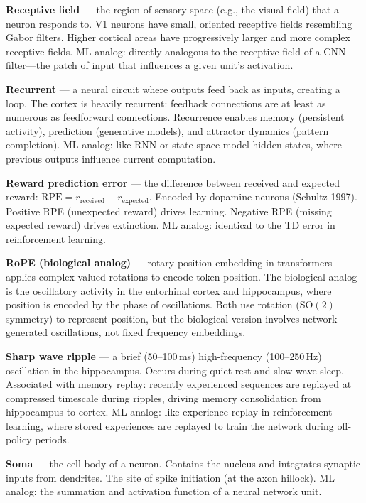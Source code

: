 \documentclass[11pt,a4paper]{article}
\begin{document}
\textbf{Receptive field} --- the region of sensory space (e.g., the visual field) that a neuron responds to. V1 neurons have small, oriented receptive fields resembling Gabor filters. Higher cortical areas have progressively larger and more complex receptive fields. ML analog: directly analogous to the receptive field of a CNN filter---the patch of input that influences a given unit's activation.

\textbf{Recurrent} --- a neural circuit where outputs feed back as inputs, creating a loop. The cortex is heavily recurrent: feedback connections are at least as numerous as feedforward connections. Recurrence enables memory (persistent activity), prediction (generative models), and attractor dynamics (pattern completion). ML analog: like RNN or state-space model hidden states, where previous outputs influence current computation.

\textbf{Reward prediction error} --- the difference between received and expected reward: $\mathrm{RPE} = r_{\mathrm{received}} - r_{\mathrm{expected}}$. Encoded by dopamine neurons (Schultz 1997). Positive RPE (unexpected reward) drives learning. Negative RPE (missing expected reward) drives extinction. ML analog: identical to the TD error in reinforcement learning.

\textbf{RoPE (biological analog)} --- rotary position embedding in transformers applies complex-valued rotations to encode token position. The biological analog is the oscillatory activity in the entorhinal cortex and hippocampus, where position is encoded by the phase of oscillations. Both use rotation ($\mathrm{SO}(2)$ symmetry) to represent position, but the biological version involves network-generated oscillations, not fixed frequency embeddings.

\textbf{Sharp wave ripple} --- a brief (50--100\,ms) high-frequency (100--250\,Hz) oscillation in the hippocampus. Occurs during quiet rest and slow-wave sleep. Associated with memory replay: recently experienced sequences are replayed at compressed timescale during ripples, driving memory consolidation from hippocampus to cortex. ML analog: like experience replay in reinforcement learning, where stored experiences are replayed to train the network during off-policy periods.

\textbf{Soma} --- the cell body of a neuron. Contains the nucleus and integrates synaptic inputs from dendrites. The site of spike initiation (at the axon hillock). ML analog: the summation and activation function of a neural network unit.
\end{document}
